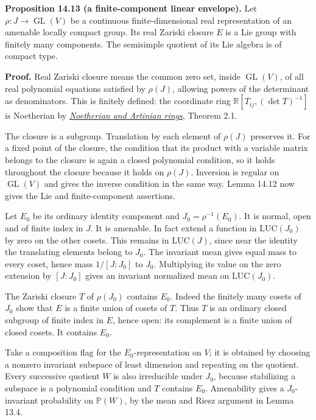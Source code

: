 \documentclass[
  11pt,
]{article}
\begin{document}
\textbf{Proposition 14.13 (a finite-component linear envelope).} Let
\(\rho:J\to\operatorname{GL}(V)\) be a continuous finite-dimensional
real representation of an amenable locally compact group. Its real
Zariski closure \(E\) is a Lie group with finitely many components. The
semisimple quotient of its Lie algebra is of compact type.

\textbf{Proof.} Real Zariski closure means the common zero set, inside
\(\operatorname{GL}(V)\), of all real polynomial equations satisfied by
\(\rho(J)\), allowing powers of the determinant as denominators. This is
finitely defined: the coordinate ring
\(\mathbb R[T_{ij},(\det T)^{-1}]\) is Noetherian by
\href{https://kokunoyumeto.github.io/open-math-courses/courses/AG-CA/AG-CA-03.html}{\emph{Noetherian
and Artinian rings}}, Theorem 2.1.

The closure is a subgroup. Translation by each element of \(\rho(J)\)
preserves it. For a fixed point of the closure, the condition that its
product with a variable matrix belongs to the closure is again a closed
polynomial condition, so it holds throughout the closure because it
holds on \(\rho(J)\). Inversion is regular on \(\operatorname{GL}(V)\)
and gives the inverse condition in the same way. Lemma 14.12 now gives
the Lie and finite-component assertions.

Let \(E_0\) be its ordinary identity component and
\(J_0=\rho^{-1}(E_0)\). It is normal, open and of finite index in \(J\).
It is amenable. In fact extend a function in \(\mathrm{LUC}(J_0)\) by
zero on the other cosets. This remains in \(\mathrm{LUC}(J)\), since
near the identity the translating elements belong to \(J_0\). The
invariant mean gives equal mass to every coset, hence mass \(1/[J:J_0]\)
to \(J_0\). Multiplying its value on the zero extension by \([J:J_0]\)
gives an invariant normalized mean on \(\mathrm{LUC}(J_0)\).

The Zariski closure \(T\) of \(\rho(J_0)\) contains \(E_0\). Indeed the
finitely many cosets of \(J_0\) show that \(E\) is a finite union of
cosets of \(T\). Thus \(T\) is an ordinary closed subgroup of finite
index in \(E\), hence open: its complement is a finite union of closed
cosets. It contains \(E_0\).

Take a composition flag for the \(E_0\)-representation on \(V\); it is
obtained by choosing a nonzero invariant subspace of least dimension and
repeating on the quotient. Every successive quotient \(W\) is also
irreducible under \(J_0\), because stabilizing a subspace is a
polynomial condition and \(T\) contains \(E_0\). Amenability gives a
\(J_0\)-invariant probability on \(\mathbb P(W)\), by the mean and Riesz
argument in Lemma 13.4.
\end{document}
